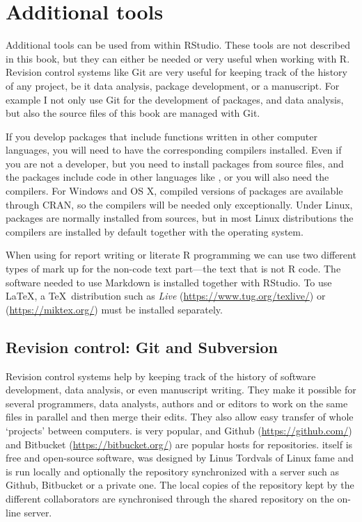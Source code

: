 \documentclass[krantz2,ChapterTOCs]{krantz}\usepackage{knitr}
\newcommand{\href}[2]{\emph{#2} (\url{#1})}
\begin{document}
\section{Additional tools}

Additional tools can be used from within RStudio. These tools are not described in this book, but they can either be needed or very useful when working with R. Revision control systems like Git are very useful for keeping track of the history of any project, be it data analysis, package development, or a manuscript. For example I not only use Git for the development of packages, and data analysis, but also the source files of this book are managed with Git.

If you develop packages that include functions written in other computer languages, you will need to have the corresponding compilers installed. Even if you are not a developer, but you need to install packages from source files, and the packages include code in other languages like ,  or  you will also need the compilers. For Windows and OS X, compiled versions of packages are available through CRAN, so the compilers will be needed only exceptionally. Under Linux, packages are normally installed from sources, but in most Linux distributions the compilers are installed by default together with the operating system.

When using  for report writing or literate R programming we can use two different types of mark up for the non-code text part---the text that is not R code. The software needed to use Markdown is installed together with RStudio. To use \LaTeX, a \TeX\ distribution such as \href{https://www.tug.org/texlive/}{Live}  or \href{https://miktex.org/}{} must be installed separately.

\subsection{Revision control: Git and Subversion}

Revision control systems help by keeping track of the history of software development, data analysis, or even manuscript writing. They make it possible for several programmers, data analysts, authors and or editors to work on the same files in parallel and then merge their edits. They also allow easy transfer of whole `projects' between computers.  is very popular, and Github (\url{https://github.com/}) and Bitbucket (\url{https://bitbucket.org/}) are popular hosts for  repositories.  itself is free and open-source software, was designed by Linus Tordvals of Linux fame and is run locally and optionally the repository synchronized with a server such as Github, Bitbucket or a private one. The local copies of the repository kept by the different collaborators are synchronised through the shared repository on the on-line server.
\end{document}
